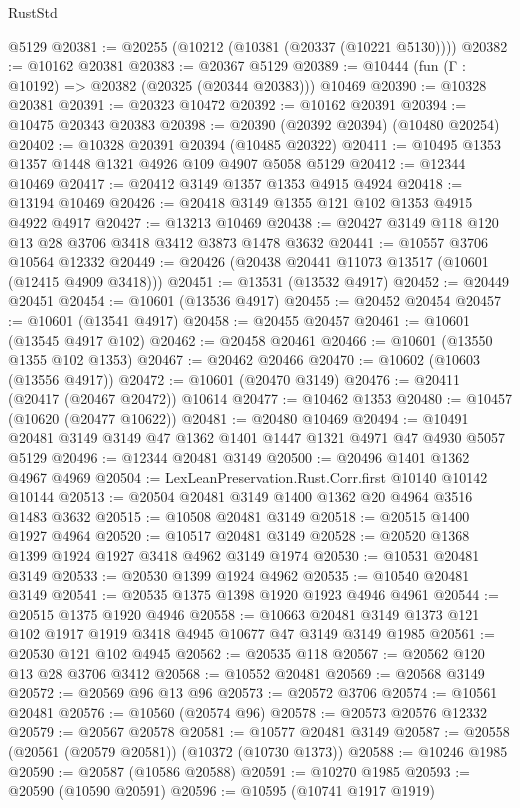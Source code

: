 \begin{lexlean}{RustStd}
\begin{coremodule}
    @5129
@20381 := @20255 (@10212 (@10381 (@20337 (@10221 @5130))))
@20382 := @10162 @20381
@20383 := @20367 @5129
@20389 := @10444 (fun (Γ : @10192) => @20382 (@20325 (@20344 @20383))) @10469
@20390 := @10328 @20381
@20391 := @20323 @10472
@20392 := @10162 @20391
@20394 := @10475 @20343 @20383
@20398 := @20390 (@20392 @20394) (@10480 @20254)
@20402 := @10328 @20391 @20394 (@10485 @20322)
@20411 := @10495 @1353 @1357 @1448 @1321 @4926 @109 @4907 @5058 @5129
@20412 := @12344 @10469
@20417 := @20412 @3149 @1357 @1353 @4915 @4924
@20418 := @13194 @10469
@20426 := @20418 @3149 @1355 @121 @102 @1353 @4915 @4922 @4917
@20427 := @13213 @10469
@20438 := @20427 @3149 @118 @120 @13 @28 @3706 @3418 @3412 @3873 @1478 @3632
@20441 := @10557 @3706 @10564 @12332
@20449 := @20426 (@20438 @20441 @11073 @13517 (@10601 (@12415 @4909 @3418)))
@20451 := @13531 (@13532 @4917)
@20452 := @20449 @20451
@20454 := @10601 (@13536 @4917)
@20455 := @20452 @20454
@20457 := @10601 (@13541 @4917)
@20458 := @20455 @20457
@20461 := @10601 (@13545 @4917 @102)
@20462 := @20458 @20461
@20466 := @10601 (@13550 @1355 @102 @1353)
@20467 := @20462 @20466
@20470 := @10602 (@10603 (@13556 @4917))
@20472 := @10601 (@20470 @3149)
@20476 := @20411 (@20417 (@20467 @20472)) @10614
@20477 := @10462 @1353
@20480 := @10457 (@10620 (@20477 @10622))
@20481 := @20480 @10469
@20494 := @10491 @20481 @3149 @3149 @47 @1362 @1401 @1447 @1321 @4971 @47 @4930 @5057 @5129
@20496 := @12344 @20481 @3149
@20500 := @20496 @1401 @1362 @4967 @4969
@20504 := LexLeanPreservation.Rust.Corr.first @10140 @10142 @10144
@20513 := @20504 @20481 @3149 @1400 @1362 @20 @4964 @3516 @1483 @3632
@20515 := @10508 @20481 @3149
@20518 := @20515 @1400 @1927 @4964
@20520 := @10517 @20481 @3149
@20528 := @20520 @1368 @1399 @1924 @1927 @3418 @4962 @3149 @1974
@20530 := @10531 @20481 @3149
@20533 := @20530 @1399 @1924 @4962
@20535 := @10540 @20481 @3149
@20541 := @20535 @1375 @1398 @1920 @1923 @4946 @4961
@20544 := @20515 @1375 @1920 @4946
@20558 := @10663 @20481 @3149 @1373 @121 @102 @1917 @1919 @3418 @4945 @10677 @47 @3149 @3149 @1985
@20561 := @20530 @121 @102 @4945
@20562 := @20535 @118
@20567 := @20562 @120 @13 @28 @3706 @3412
@20568 := @10552 @20481
@20569 := @20568 @3149
@20572 := @20569 @96 @13 @96
@20573 := @20572 @3706
@20574 := @10561 @20481
@20576 := @10560 (@20574 @96)
@20578 := @20573 @20576 @12332
@20579 := @20567 @20578
@20581 := @10577 @20481 @3149
@20587 := @20558 (@20561 (@20579 @20581)) (@10372 (@10730 @1373))
@20588 := @10246 @1985
@20590 := @20587 (@10586 @20588)
@20591 := @10270 @1985
@20593 := @20590 (@10590 @20591)
@20596 := @10595 (@10741 @1917 @1919)

\end{coremodule}
\end{lexlean}
